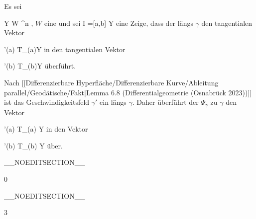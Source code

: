 {

Es sei

\mavergleichskette
{\vergleichskette
{ Y
}
{ \subseteq }{ W
}
{ \subseteq }{ \R^n
}
{    }{
}
{   }{
}
}
{}{}{,}
$W$
eine
und sei
\maabb {\gamma} {I =[a,b]} {Y
} {}
eine
Zeige, dass der
längs $\gamma$ den tangentialen Vektor

\mavergleichskette
{\vergleichskette
{ \gamma'(a)
}
{ \in }{ T_{\gamma(a)}Y
}
{  }{
}
{    }{
}
{   }{
}
}
{}{}{}
in den tangentialen Vektor

\mavergleichskette
{\vergleichskette
{ \gamma'(b)
}
{ \in }{ T_{\gamma(b)}Y
}
{  }{
}
{    }{
}
{   }{
}
}
{}{}{}
überführt.

}
{

Nach
[[Differenzierbare Hyperfläche/Differenzierbare Kurve/Ableitung parallel/Geodätische/Fakt|Lemma 6.8 (Differentialgeometrie (Osnabrück 2023))]]
ist das Geschwindigkeitsfeld $\gamma'$ ein
längs $\gamma$. Daher überführt der
$\Psi_\gamma$  zu $\gamma$ den Vektor

\mavergleichskette
{\vergleichskette
{ \gamma'(a)
}
{ \in }{  T_{\gamma(a)} Y
}
{  }{
}
{    }{
}
{   }{
}
}
{}{}{}
in den Vektor

\mavergleichskette
{\vergleichskette
{ \gamma'(b)
}
{ \in }{  T_{\gamma(b)} Y
}
{  }{
}
{    }{
}
{   }{
}
}
{}{}{}
über.

 }

__NOEDITSECTION__

{0}

{

}
{  }

__NOEDITSECTION__

{3}

